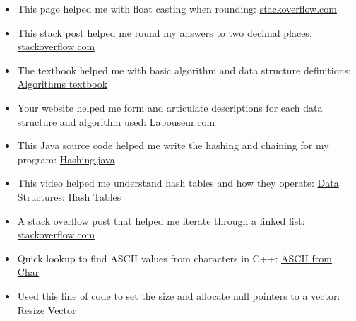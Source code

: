 \documentclass[letterpaper, 10pt,DIV=13]{scrartcl}
\numberwithin{equation}{section} %
\numberwithin{figure}{section} %
\numberwithin{table}{section} %
\begin{document}
\begin{itemize}
    \item This page helped me with float casting when rounding:
    \href{https://stackoverflow.com/questions/5456801/c-int-float-casting}
    {stackoverflow.com}

    \item This stack post helped me round my answers to two decimal places:
    \href{https://stackoverflow.com/questions/1343890/how-do-i-restrict-a-float-value-to-only-two-places-after-the-decimal-point-in-c}{stackoverflow.com}
    
    \item The textbook helped me with basic algorithm and data structure definitions: \href{http://jeffe.cs.illinois.edu/teaching/algorithms/book/Algorithms-JeffE.pdf}{Algorithms textbook}

    \item Your website helped me form and articulate descriptions for each data structure and algorithm used: \href{https://www.labouseur.com/courses/algorithms/}{Labouseur.com}

    \item This Java source code helped me write the hashing and chaining for my program:
    \href{https://www.labouseur.com/courses/algorithms/Hashing.java.html}{Hashing.java}

    \item This video helped me understand hash tables and how they operate:
    \href{https://youtu.be/shs0KM3wKv8?si=T-fq8pJj0R4z_1ZD}{Data Structures: Hash Tables}

    \item A stack overflow post that helped me iterate through a linked list:
    \href{https://stackoverflow.com/questions/17450085/traversing-a-single-linked-list-in-order}{stackoverflow.com}

    \item Quick lookup to find ASCII values from characters in C++:
    \href{https://www.programiz.com/cpp-programming/examples/ASCII-value-character}{ASCII from Char}

    \item Used this line of code to set the size and allocate null pointers to a vector:
\href{https://www.tutorialspoint.com/cpp_standard_library/cpp_vector_resize.htm}{Resize Vector}


    
    
    
\end{itemize}

\pagebreak

% 
\end{document}

